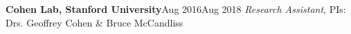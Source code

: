 {\entrybig
	{\textbf{Cohen Lab, Stanford University}}{Aug 2016\textendash Aug 2018}
	{\textit{Research Assistant}, PIs: Drs. Geoffrey Cohen \& Bruce McCandliss}{} %



	


}
